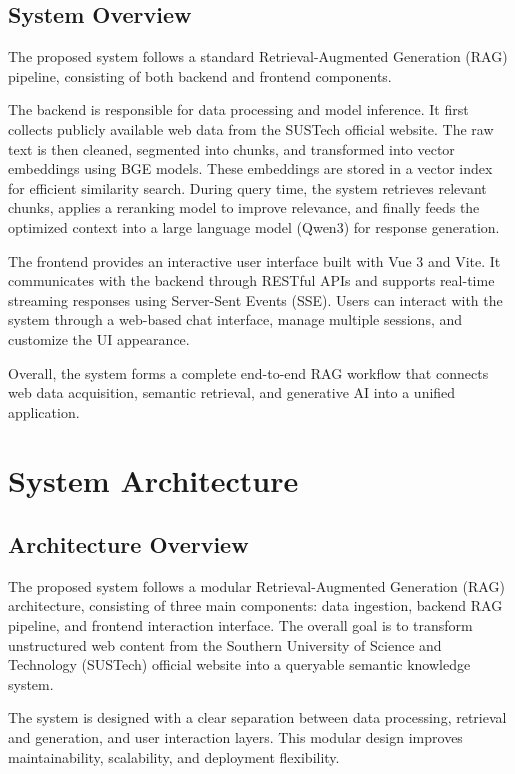 \section{System Overview}

The proposed system follows a standard Retrieval-Augmented Generation (RAG) pipeline, consisting of both backend and frontend components.

The backend is responsible for data processing and model inference. It first collects publicly available web data from the SUSTech official website. The raw text is then cleaned, segmented into chunks, and transformed into vector embeddings using BGE models. These embeddings are stored in a vector index for efficient similarity search. During query time, the system retrieves relevant chunks, applies a reranking model to improve relevance, and finally feeds the optimized context into a large language model (Qwen3) for response generation.

The frontend provides an interactive user interface built with Vue 3 and Vite. It communicates with the backend through RESTful APIs and supports real-time streaming responses using Server-Sent Events (SSE). Users can interact with the system through a web-based chat interface, manage multiple sessions, and customize the UI appearance.

Overall, the system forms a complete end-to-end RAG workflow that connects web data acquisition, semantic retrieval, and generative AI into a unified application.


\chapter{System Architecture}


\section{Architecture Overview}

The proposed system follows a modular Retrieval-Augmented Generation (RAG) architecture, consisting of three main components: data ingestion, backend RAG pipeline, and frontend interaction interface. The overall goal is to transform unstructured web content from the Southern University of Science and Technology (SUSTech) official website into a queryable semantic knowledge system.

The system is designed with a clear separation between data processing, retrieval and generation, and user interaction layers. This modular design improves maintainability, scalability, and deployment flexibility.

